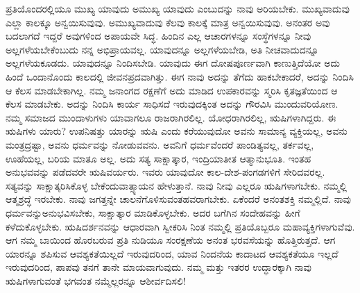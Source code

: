 ಪ್ರತಿಯೊಂದರಲ್ಲಿಯೂ ಮುಖ್ಯ ಯಾವುದು ಅಮುಖ್ಯ ಯಾವುದು ಎಂಬುದನ್ನು ನಾವು ಅರಿಯಬೇಕು. ಮುಖ್ಯವಾದುವು ಎಲ್ಲಾ ಕಾಲಕ್ಕೂ ಅನ್ವಯಿಸುವುವು. ಅಮುಖ್ಯವಾದುವು ಕೆಲವು ಕಾಲಕ್ಕೆ ಮಾತ್ರ ಅನ್ವಯಿಸುವುವು. ಅನಂತರ ಅವು ಬದಲಾಗದೆ ಇದ್ದರೆ ಅವುಗಳಿಂದ ಅಪಾಯವೇ ಸಿದ್ಧ. ಹಿಂದಿನ ಎಲ್ಲ ಆಚಾರಗಳನ್ನೂ ಸಂಸ್ಥೆಗಳನ್ನೂ ನೀವು ಅಲ್ಲಗಳೆಯಬೇಕೆಂಬುದು ನನ್ನ ಅಭಿಪ್ರಾಯವಲ್ಲ. ಯಾವುದನ್ನೂ ಅಲ್ಲಗಳೆಯಬೇಡಿ, ಅತಿ ನೀಚವಾದುದನ್ನೂ ಅಲ್ಲಗಳೆಯಕೂಡದು. ಯಾವುದನ್ನೂ ನಿಂದಿಸಬೇಡಿ. ಯಾವುದು ಈಗ ದೋಷಪೂರ್ಣವಾಗಿ ಕಾಣುತ್ತಿದೆಯೋ ಅದು ಹಿಂದೆ ಒಂದಾನೊಂದು ಕಾಲದಲ್ಲಿ ಜೀವನಪ್ರದವಾಗಿತ್ತು. ಈಗ ನಾವು ಅದನ್ನು ತೆಗೆದು ಹಾಕಬೇಕಾದರೆ, ಅದನ್ನು ನಿಂದಿಸಿ ಆ ಕೆಲಸ ಮಾಡಬೇಕಾಗಿಲ್ಲ. ನಮ್ಮ ಜನಾಂಗದ ರಕ್ಷಣೆಗೆ ಅದು ಮಾಡಿದ ಉಪಕಾರವನ್ನು ಸ್ಮರಿಸಿ ಕೃತಜ್ಞತೆಯಿಂದ ಆ ಕೆಲಸ ಮಾಡಬೇಕು. ಅದನ್ನು ನಿಂದಿಸಿ ಕಾರ್ಯ ಸಾಧಿಸದೆ ಇರುವುದಕ್ಕಿಂತ ಅದನ್ನು ಗೌರವಿಸಿ ಮುಂದುವರಿಯೋಣ. ನಮ್ಮ ಸಮಾಜದ ಮುಂದಾಳುಗಳು ಯಾವಾಗಲೂ ರಾಜರಾಗಿರಲಿಲ್ಲ. ಯೋಧರಾಗಿರಲಿಲ್ಲ, ಋಷಿಗಳಾಗಿದ್ದರು. ಈ ಋಷಿಗಳು ಯಾರು? ಉಪನಿಷತ್ತು ಯಾರನ್ನು ಋಷಿ ಎಂದು ಕರೆಯುವುದೋ ಅವನು ಸಾಮಾನ್ಯ ವ್ಯಕ್ತಿಯಲ್ಲ, ಅವನು ಮಂತ್ರದ್ರಷ್ಟಾ, ಅವನು ಧರ್ಮವನ್ನು ನೋಡುವವನು. ಅವನಿಗೆ ಧರ್ಮವೆಂದರೆ ಪಾಂಡಿತ್ಯವಲ್ಲ, ತರ್ಕವಲ್ಲ, ಊಹೆಯಲ್ಲ, ಬರಿಯ ಮಾತೂ ಅಲ್ಲ. ಅದು ಸತ್ಯ ಸಾಕ್ಷಾತ್ಕಾರ, ಇಂದ್ರಿಯಾತೀತ ಆತ್ಮಾನುಭೂತಿ. ಇಂತಹ ಅನುಭವವನ್ನು ಪಡೆದವರೇ ಋಷಿವರ್ಯರು. ಇವರು ಯಾವುದೋ ಕಾಲ-ದೇಶ-ಪಂಗಡಗಳಿಗೆ ಸೇರಿದವರಲ್ಲ. ಸತ್ಯವನ್ನು ಸಾಕ್ಷಾತ್ಕರಿಸಿಕೊಳ್ಳ ಬೇಕೆಂದು\break ವಾತ್ಸ್ಯಾಯನ ಹೇಳುತ್ತಾನೆ. ನಾವು ನೀವು ಎಲ್ಲರೂ ಋಷಿಗಳಾಗಬೇಕು. ನಮ್ಮಲ್ಲಿ ಆತ್ಮಶ್ರದ್ಧೆ ಇರಬೇಕು. ನಾವು ಜಗತ್ತನ್ನೇ ಚಾಲನೆಗೊಳಿಸುವಂತಹವ\break ರಾಗಬೇಕು. ಏಕೆಂದರೆ ಅನಂತಶಕ್ತಿ ನಮ್ಮಲ್ಲಿದೆ. ನಾವು ಧರ್ಮವನ್ನು\break ಅನುಭವಿಸಬೇಕು, ಸಾಕ್ಷಾತ್ಕಾರ ಮಾಡಿಕೊಳ್ಳಬೇಕು. ಅದರ ಬಗೆಗಿನ ಸಂದೇಹವನ್ನು ಹೀಗೆ ಕಳೆದುಕೊಳ್ಳಬೇಕು. ಋಷಿದರ್ಶನವನ್ನು ಆಧಾರವಾಗಿ ಸ್ವೀಕರಿಸಿ ನಿಂತ ನಮ್ಮಲ್ಲಿ ಪ್ರತಿಯೊಬ್ಬರೂ ಮಹಾವ್ಯಕ್ತಿಗಳಾಗುವೆವು. ಆಗ ನಮ್ಮ ಬಾಯಿಂದ ಹೊರಬರುವ ಪ್ರತಿ ನುಡಿಯೂ ಸಂರಕ್ಷಣೆಯ ಅನಂತ ಭರವಸೆಯನ್ನು ಹೊತ್ತಿರುತ್ತದೆ. ಆಗ ಯಾರನ್ನೂ ಶಪಿಸುವ ಆವಶ್ಯಕತೆಯಿಲ್ಲದೆ ಇರುವುದರಿಂದ, ಯಾವ ನಿಂದನೆಯ ಕಾದಾಟದ ಆವಶ್ಯಕತೆಯೂ ಇಲ್ಲದೆ ಇರುವುದರಿಂದ, ಪಾಪವು ತನಗೆ ತಾನೇ ಮಾಯವಾಗುವುದು. ನಮ್ಮ ಮತ್ತು ಇತರರ ಉದ್ಧಾರಕ್ಕಾಗಿ ನಾವು ಋಷಿಗಳಾಗುವಂತೆ ಭಗವಂತ ನಮ್ಮೆಲ್ಲರನ್ನೂ ಆಶೀರ್ವದಿಸಲಿ!

